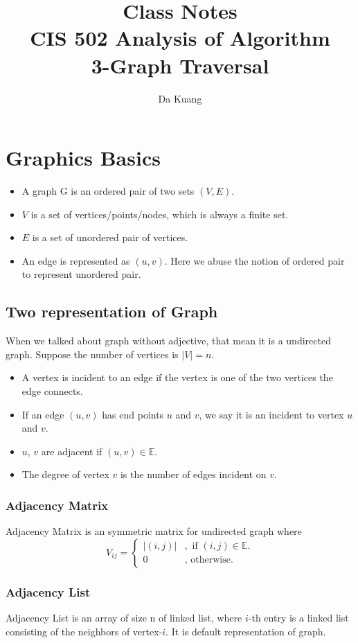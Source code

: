 \documentclass[en,hazy,blue,normal,12pt]{elegantnote}
\title{Class Notes\\CIS 502 Analysis of Algorithm\\3-Graph Traversal}
\author{Da Kuang}
\institute{University of Pennsylvania}
\date{}
\begin{document}
\maketitle
\newpage
\tableofcontents
\newpage
\section{Graphics Basics}
\begin{itemize}
\item A graph G is an ordered pair of two sets $(V, E)$.
\item $V$ is a set of vertices/points/nodes, which is always a finite set.
\item $E$ is a set of unordered pair of vertices.
\item An edge is represented as $(u ,v)$. Here we abuse the notion of ordered pair to represent unordered pair.
\end{itemize}

\subsection{Two representation of Graph}
When we talked about graph without adjective, that mean it is a 
undirected graph. Suppose the number of vertices is $|V| = n$.
\begin{itemize}
 \item A vertex is incident to an edge if the vertex is one of the two vertices 
the edge connects.
\item If an edge $(u, v)$ has end points $u$ and $v$, we say it is an incident 
to vertex $u$ and $v$.
\item $u$, $v$ are adjacent if $(u, v) \in \mathbb{E}$.
\item The degree of vertex $v$ is the number of edges incident on $v$.
\end{itemize}

\subsubsection{Adjacency Matrix}
Adjacency Matrix is an symmetric matrix for undirected graph where
\[
V_{ij} = 
\begin{cases*}
 |(i,j)| & ,\text{ if $(i,j) \in \mathbb{E}$.}\\
 0  &,\text{ otherwise.}
\end{cases*}
\]
\subsubsection{Adjacency List}
Adjacency List is an array of size n of linked list, where $i$-th entry is 
a linked list consisting of the neighbors of vertex-$i$. It is default 
representation of graph.
\end{document}
